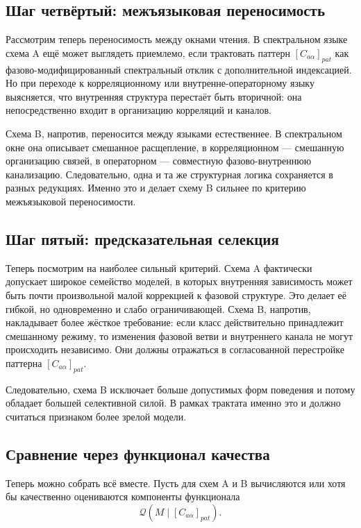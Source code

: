 \documentclass[12pt,a4paper]{article}
\begin{document}
\subsection{Шаг четвёртый: межъязыковая переносимость}

Рассмотрим теперь переносимость между окнами чтения. В спектральном языке схема A ещё может выглядеть приемлемо, если трактовать паттерн \([C_{a\alpha}]_{pat}\) как фазово-модифицированный спектральный отклик с дополнительной индексацией. Но при переходе к корреляционному или внутренне-операторному языку выясняется, что внутренняя структура перестаёт быть вторичной: она непосредственно входит в организацию корреляций и каналов.

Схема B, напротив, переносится между языками естественнее. В спектральном окне она описывает смешанное расщепление, в корреляционном --- смешанную организацию связей, в операторном --- совместную фазово-внутреннюю канализацию. Следовательно, одна и та же структурная логика сохраняется в разных редукциях. Именно это и делает схему B сильнее по критерию межъязыковой переносимости.

\subsection{Шаг пятый: предсказательная селекция}

Теперь посмотрим на наиболее сильный критерий. Схема A фактически допускает широкое семейство моделей, в которых внутренняя зависимость может быть почти произвольной малой коррекцией к фазовой структуре. Это делает её гибкой, но одновременно и слабо ограничивающей. Схема B, напротив, накладывает более жёсткое требование: если класс действительно принадлежит смешанному режиму, то изменения фазовой ветви и внутреннего канала не могут происходить независимо. Они должны отражаться в согласованной перестройке паттерна \([C_{a\alpha}]_{pat}\).

Следовательно, схема B исключает больше допустимых форм поведения и потому обладает большей селективной силой. В рамках трактата именно это и должно считаться признаком более зрелой модели.

\subsection{Сравнение через функционал качества}

Теперь можно собрать всё вместе. Пусть для схем A и B вычисляются или хотя бы качественно оцениваются компоненты функционала
\begin{equation}
\mathcal{Q}(M\mid [C_{a\alpha}]_{pat}).
\end{equation}
\end{document}
